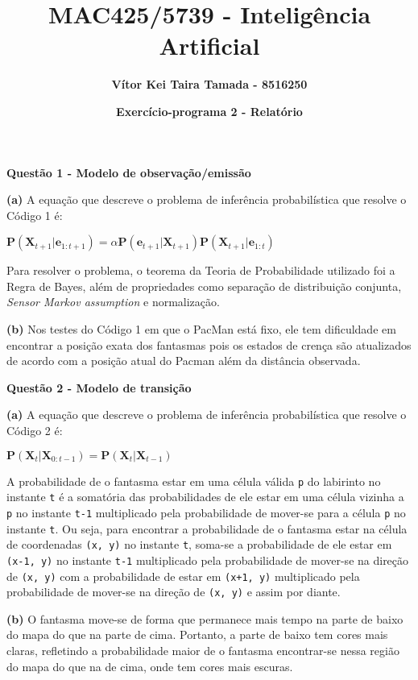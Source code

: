 \documentclass{article}
\title{\textbf{MAC425/5739 - Inteligência Artificial}}
\author{\textbf{Vítor Kei Taira Tamada - 8516250}}
\date{\textbf{Exercício-programa 2 - Relatório}}
\begin{document}
\maketitle

\textbf{Questão 1 - Modelo de observação/emissão}

\quad \textbf{(a)} A equação que descreve o problema de inferência probabilística que resolve o Código 1 é:
\begin{center}
$\textbf{P}(\textbf{X}_{t+1}|\textbf{e}_{1:t+1}) = \alpha\textbf{P}(\textbf{e}_{t+1}|\textbf{X}_{t+1})\textbf{P}(\textbf{X}_{t+1}|\textbf{e}_{1:t})$
\end{center}

\quad Para resolver o problema, o teorema da Teoria de Probabilidade utilizado foi a Regra de Bayes, além de propriedades como separação de distribuição conjunta, 
\textit{Sensor Markov assumption} e normalização.

\bigskip
\quad \textbf{(b)} Nos testes do Código 1 em que o PacMan está fixo, ele tem dificuldade em encontrar a posição exata dos fantasmas pois os estados de crença são atualizados de acordo com a posição atual do Pacman além da distância observada.

\bigskip
\textbf{Questão 2 - Modelo de transição}

\quad \textbf{(a)} A equação que descreve o problema de inferência probabilística que resolve o Código 2 é:
\begin{center}
$\textbf{P}(\textbf{X}_{t}|\textbf{X}_{0:t-1}) = \textbf{P}(\textbf{X}_{t}|\textbf{X}_{t-1})$
\end{center}

\quad A probabilidade de o fantasma estar em uma célula válida \texttt{p} do labirinto no instante \texttt{t} é a somatória das probabilidades de ele estar em uma célula vizinha a \texttt{p} no instante \texttt{t-1} multiplicado pela probabilidade de mover-se para a célula \texttt{p} no instante \texttt{t}. Ou seja, para encontrar a probabilidade de o fantasma estar na célula de coordenadas \texttt{(x, y)} no instante \texttt{t}, soma-se a probabilidade de ele estar em \texttt{(x-1, y)} no instante \texttt{t-1} multiplicado pela probabilidade de mover-se na direção de \texttt{(x, y)} com a probabilidade de estar em \texttt{(x+1, y)} multiplicado pela probabilidade de mover-se na direção de \texttt{(x, y)} e assim por diante.

\bigskip
\quad \textbf{(b)} O fantasma move-se de forma que permanece mais tempo na parte de baixo do mapa do que na parte de cima. Portanto, a parte de baixo tem cores mais claras, refletindo a probabilidade maior de o fantasma encontrar-se nessa região do mapa do que na de cima, onde tem cores mais escuras.
\end{document}
